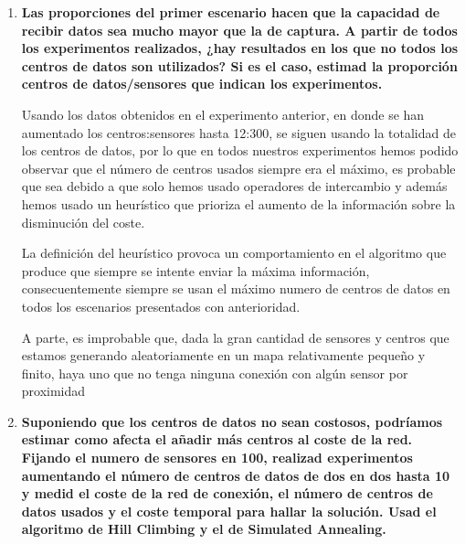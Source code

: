 \documentclass{article}
\begin{document}
\begin{enumerate}
  \item \textbf{Las proporciones del primer escenario hacen que la capacidad de recibir datos sea mucho mayor que la de captura. A partir de todos los experimentos realizados, ¿hay resultados en los que no todos los centros de datos son utilizados? Si es el caso, estimad la proporción centros de datos/sensores que indican los experimentos.}

  Usando los datos obtenidos en el experimento anterior, en donde se han aumentado los centros:sensores hasta 12:300, se siguen usando la totalidad de los centros de datos, por lo que en todos nuestros experimentos hemos podido observar que el número de centros usados siempre era el máximo, es probable que sea debido a que solo hemos usado operadores de intercambio y además hemos usado un heurístico que prioriza el aumento de la información sobre la disminución del coste.\par
  La definición del heurístico provoca un comportamiento en el algoritmo que produce que siempre se intente enviar la máxima información, consecuentemente siempre se usan el máximo numero de centros de datos en todos los escenarios presentados con anterioridad.\par
  A parte, es improbable que, dada la gran cantidad de sensores y centros que estamos generando aleatoriamente en un mapa relativamente pequeño y finito, haya uno que no tenga ninguna conexión con algún sensor por proximidad


  \item \textbf{Suponiendo que los centros de datos no sean costosos, podríamos estimar como afecta el añadir más centros al coste de la red. Fijando el numero de sensores en 100, realizad experimentos aumentando el número de centros de datos de dos en dos hasta 10 y medid el coste de la red de conexión, el número de centros de datos usados y el coste temporal para hallar la solución. Usad el algoritmo de Hill Climbing y el de Simulated Annealing.}


\end{enumerate}
\end{document}
